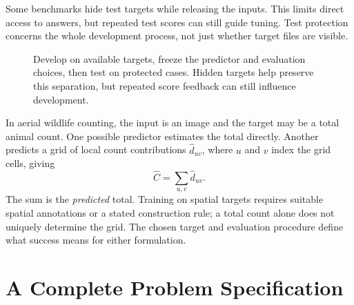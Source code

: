 Some benchmarks hide test targets while releasing the inputs. This limits direct access to answers, but repeated test scores can still guide tuning. Test protection concerns the whole development process, not just whether target files are visible.

\begin{figure}[t]
\centering
{}
\caption{Develop on available targets, freeze the predictor and evaluation choices, then test on protected cases. Hidden targets help preserve this separation, but repeated score feedback can still influence development.}
\label{fig:hidden-evaluation-example}
\end{figure}

\begin{samepage}
\begin{example}
In aerial wildlife counting, the input is an image and the target may be a total animal count. One possible predictor estimates the total directly. Another predicts a grid of local count contributions $\hat d_{uv}$, where $u$ and $v$ index the grid cells, giving
\[
\hat C=\sum_{u,v}\hat d_{uv}.
\]
The sum is the \emph{predicted} total. Training on spatial targets requires suitable spatial annotations or a stated construction rule; a total count alone does not uniquely determine the grid. The chosen target and evaluation procedure define what success means for either formulation.
\end{example}
\end{samepage}

\section{A Complete Problem Specification}

